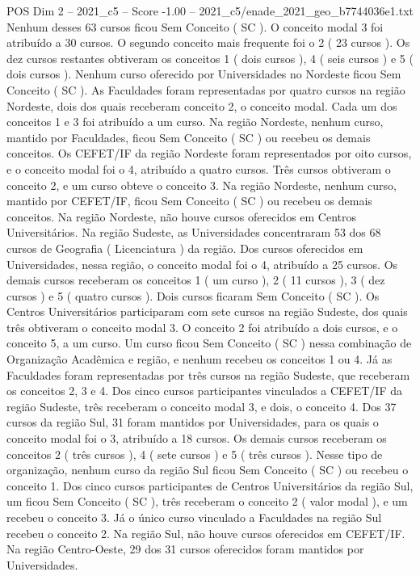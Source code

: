 \begin{textsample}{POS Dim 2 – 2021\_c5 – Score -1.00 – 2021\_c5/enade\_2021\_geo\_b7744036e1.txt}
Nenhum desses 63 cursos ficou Sem Conceito ( SC ).
O conceito modal 3 foi atribuído a 30 cursos.
O segundo conceito mais frequente foi o 2 ( 23 cursos ).
Os dez cursos restantes obtiveram os conceitos 1 ( dois cursos ), 4 ( seis cursos ) e 5 ( dois cursos ).
Nenhum curso oferecido por Universidades no Nordeste ficou Sem Conceito ( SC ).
As Faculdades foram representadas por quatro cursos na região Nordeste, dois dos quais receberam conceito 2, o conceito modal.
Cada um dos conceitos 1 e 3 foi atribuído a um curso.
Na região Nordeste, nenhum curso, mantido por Faculdades, ficou Sem Conceito ( SC ) ou recebeu os demais conceitos.
Os CEFET/IF da região Nordeste foram representados por oito cursos, e o conceito modal foi o 4, atribuído a quatro cursos.
Três cursos obtiveram o conceito 2, e um curso obteve o conceito 3.
Na região Nordeste, nenhum curso, mantido por CEFET/IF, ficou Sem Conceito ( SC ) ou recebeu os demais conceitos.
Na região Nordeste, não houve cursos oferecidos em Centros Universitários.
Na região Sudeste, as Universidades concentraram 53 dos 68 cursos de Geografia ( Licenciatura ) da região.
Dos cursos oferecidos em Universidades, nessa região, o conceito modal foi o 4, atribuído a 25 cursos.
Os demais cursos receberam os conceitos 1 ( um curso ), 2 ( 11 cursos ), 3 ( dez cursos ) e 5 ( quatro cursos ).
Dois cursos ficaram Sem Conceito ( SC ).
Os Centros Universitários participaram com sete cursos na região Sudeste, dos quais três obtiveram o conceito modal 3.
O conceito 2 foi atribuído a dois cursos, e o conceito 5, a um curso.
Um curso ficou Sem Conceito ( SC ) nessa combinação de Organização Acadêmica e região, e nenhum recebeu os conceitos 1 ou 4.
Já as Faculdades foram representadas por três cursos na região Sudeste, que receberam os conceitos 2, 3 e 4.
Dos cinco cursos participantes vinculados a CEFET/IF da região Sudeste, três receberam o conceito modal 3, e dois, o conceito 4.
Dos 37 cursos da região Sul, 31 foram mantidos por Universidades, para os quais o conceito modal foi o 3, atribuído a 18 cursos.
Os demais cursos receberam os conceitos 2 ( três cursos ), 4 ( sete cursos ) e 5 ( três cursos ).
Nesse tipo de organização, nenhum curso da região Sul ficou Sem Conceito ( SC ) ou recebeu o conceito 1.
Dos cinco cursos participantes de Centros Universitários da região Sul, um ficou Sem Conceito ( SC ), três receberam o conceito 2 ( valor modal ), e um recebeu o conceito 3.
Já o único curso vinculado a Faculdades na região Sul recebeu o conceito 2.
Na região Sul, não houve cursos oferecidos em CEFET/IF.
Na região Centro-Oeste, 29 dos 31 cursos oferecidos foram mantidos por Universidades.

\end{textsample}
